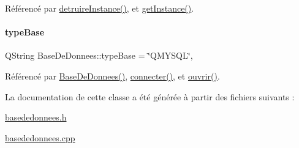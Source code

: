 Référencé par \hyperlink{class_base_de_donnees_a457401c0816b888c77ce915997545f4e}{detruire\+Instance()}, et \hyperlink{class_base_de_donnees_a80028aa2b6b4fbf30fb2e36357b7d3d3}{get\+Instance()}.

\mbox{\label{class_base_de_donnees_ab682b82167f494496a6531bfe522b42b}} 
\paragraph{\texorpdfstring{type\+Base}{typeBase}}
{\footnotesize\ttfamily Q\+String Base\+De\+Donnees\+::type\+Base = \char`\"{}Q\+M\+Y\+S\+QL\char`\"{}\hspace{0.3cm}{\ttfamily [static]}, {\ttfamily [private]}}



Référencé par \hyperlink{class_base_de_donnees_a10dd177f1008f675ab78c2221b2a6750}{Base\+De\+Donnees()}, \hyperlink{class_base_de_donnees_ab2e092285ccc0ee1cce61a1774218561}{connecter()}, et \hyperlink{class_base_de_donnees_a7f6a5510b08017b0d99115a84252f186}{ouvrir()}.



La documentation de cette classe a été générée à partir des fichiers suivants \+:\begin{DoxyCompactItemize}
\item 
\hyperlink{basededonnees_8h}{basededonnees.\+h}\item 
\hyperlink{basededonnees_8cpp}{basededonnees.\+cpp}\end{DoxyCompactItemize}
